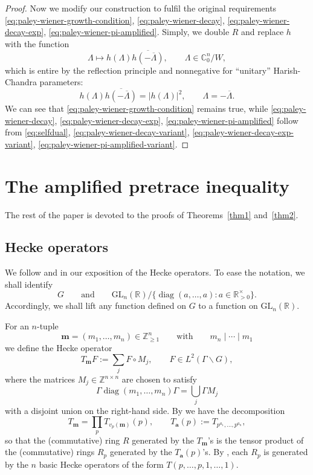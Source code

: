 \documentclass[11pt,oneside]{amsart}
\numberwithin{equation}{section}
\theoremstyle{remark}
\theoremstyle{plain}
\DeclareMathOperator{\diag}{diag}
\newcommand\GL{\mathrm{GL}}
\newcommand\ZZ{\mathbb{Z}}
\newcommand\RR{\mathbb{R}}
\newcommand\CC{\mathbb{C}}
\newcommand{\ba}{\mathbf{a}}
\newcommand{\mbm}{\mathbf{m}}
\newcommand\ov{\overline}
\newcommand\bs{\backslash}
\renewcommand\geq{\geqslant}
\begin{document}
\begin{proof}
Now we modify our construction to fulfil the original requirements \eqref{eq:paley-wiener-growth-condition}, \eqref{eq:paley-wiener-decay}, \eqref{eq:paley-wiener-decay-exp}, \eqref{eq:paley-wiener-pi-amplified}. Simply, we double $R$ and replace $h$ with the function
\begin{equation}\label{eq:squared-h}
\Lambda \mapsto h(\Lambda)\ov{h(-\ov{\Lambda})},\qquad \Lambda\in\CC^n_0/W,
\end{equation}
which is entire by the reflection principle and nonnegative for ``unitary'' Harish-Chandra parameters:
\[h(\Lambda)\ov{h(-\ov{\Lambda})}=|h(\Lambda)|^2,\qquad\Lambda=-\ov{\Lambda}.\]
We can see that \eqref{eq:paley-wiener-growth-condition} remains true, while \eqref{eq:paley-wiener-decay}, \eqref{eq:paley-wiener-decay-exp}, \eqref{eq:paley-wiener-pi-amplified} follow from \eqref{eq:selfdual}, \eqref{eq:paley-wiener-decay-variant}, \eqref{eq:paley-wiener-decay-exp-variant}, \eqref{eq:paley-wiener-pi-amplified-variant}.
\end{proof}

\section{The amplified pretrace inequality}\label{sec6}

The rest of the paper is devoted to the proofs of Theorems~\ref{thm1} and~\ref{thm2}.

\subsection{Hecke operators}
We follow \cite[Ch.~3]{Shimura} and \cite[\S4]{BM-IMRN} in our exposition of the Hecke operators. To ease the notation, we shall identify
\begin{equation}\label{eq:id-SL-GL}
G \qquad \text{and} \qquad \GL_n(\RR) / \{\diag(a,\dotsc,a):a\in\RR^{\times}_{>0}\}.
\end{equation}
Accordingly, we shall lift any function defined on $G$ to a function on $\GL_n(\RR)$.

For an $n$-tuple
\[
\mbm=(m_1,\dotsc,m_n)\in\ZZ_{\geq 1}^n \qquad \text{with} \qquad m_n\mid\dotsb\mid m_1
\]
we define the Hecke operator
\[
T_\mbm F:=\sum_j F \circ M_j,\qquad F\in L^2(\Gamma \bs G),
\]
where the matrices $M_j\in \ZZ^{n\times n}$ are chosen to satisfy
\[
\Gamma \diag(m_1,\dotsc,m_n) \Gamma = \bigcup_j \Gamma M_j
\]
with a disjoint union on the right-hand side. By \cite[Prop.~3.16]{Shimura} we have the decomposition
\[T_\mbm=\prod_p T_{v_p(\mbm)}(p),\qquad T_{\ba}(p):=T_{p^{a_1},\dotsc,p^{a_n}},\]
so that the (commutative) ring $R$ generated by the $T_\mbm$'s is the tensor product of the (commutative) rings $R_p$ generated by the $T_{\ba}(p)$'s. By \cite[Th.~3.20]{Shimura}, each $R_p$ is generated by the $n$ basic Hecke operators of the form $T(p,\dotsc,p,1,\dotsc,1)$.
\end{document}

